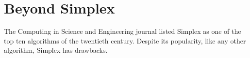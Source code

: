%
%
%
%

\section*{Beyond Simplex}
The Computing in Science and Engineering journal listed Simplex as one of the top ten algorithms of the twentieth century.\cite{Nash2000}
Despite its popularity, like any other algorithm, Simplex has drawbacks.

